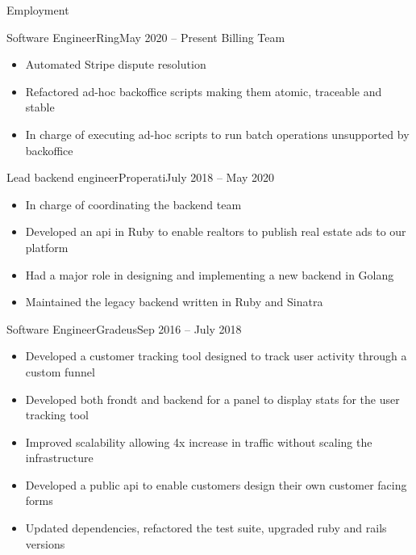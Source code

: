 \documentclass[]{mcdowellcv}
\begin{document}
	\makeheader
	
	\begin{cvsection}{Employment}
		\begin{cvsubsection}{Software Engineer}{Ring}{May 2020 -- Present}
			Billing Team
			\begin{itemize}
				\item Automated Stripe dispute resolution
				\item Refactored ad-hoc backoffice scripts making them atomic, traceable and stable
				\item In charge of executing ad-hoc scripts to run batch operations unsupported by backoffice 
			\end{itemize}
		\end{cvsubsection}
		
		\begin{cvsubsection}{Lead backend engineer}{Properati}{July 2018 -- May 2020}
			\begin{itemize}
				\item In charge of coordinating the backend team
        				\item Developed an api in Ruby to enable realtors to publish real estate ads to our platform
				\item Had a major role in designing and implementing a new backend in Golang
        \item Maintained the legacy backend written in Ruby and Sinatra
			\end{itemize}
		\end{cvsubsection}
		
		\begin{cvsubsection}{Software Engineer}{Gradeus}{Sep 2016 -- July 2018}		
			\begin{itemize}
				\item Developed a customer tracking tool designed to track user activity through a custom funnel
        				\item Developed both frondt and backend for a panel to display stats for the user tracking tool
        				\item Improved scalability allowing 4x increase in traffic without scaling the infrastructure
				\item Developed a public api to enable customers design their own customer facing forms
        				\item Updated dependencies, refactored the test suite, upgraded ruby and rails versions
			\end{itemize}
		\end{cvsubsection}
		

\end{cvsection}
\end{document}
